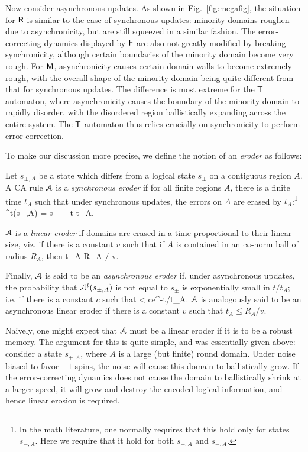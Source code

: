 \documentclass[pra,aps,twocolumn,groupedaddress,superscriptaddress,nofootinbib,preprintnumbers]{revtex4-2}
\begin{document}
	Now consider asynchronous updates. As shown in Fig.~\ref{fig:megafig}, the situation for $\mathsf{R}$ is similar to the case of synchronous updates: minority domains roughen due to asynchronicity, but are still squeezed in a similar fashion. The error-correcting dynamics displayed by $\mathsf{F}$ are also not greatly modified by breaking synchronicity, although certain boundaries of the minority domain become very rough. For $\mathsf{M}$, asynchronicity causes certain domain walls to become extremely rough, with the overall shape of the minority domain being quite different from that for synchronous updates. The difference is most extreme for the $\mathsf{T}$ automaton, where asynchronicity causes the boundary of the minority domain to rapidly disorder, with the disordered region ballistically expanding across the entire system. The $\mathsf{T}$ automaton thus relies crucially on synchronicity to perform error correction.  
	
	To make our discussion more precise, we define the notion of an {\it eroder} as follows: 
	\begin{definition}[eroders]
		Let $s_{\pm,A}$ be a state which differs from a logical state $s_{\pm}$ on a  contiguous region $A$. A CA rule $\mathcal{A}$ is a {\it synchronous eroder} if for all finite regions $A$, there is a finite time $t_A$ such that under synchronous updates, the errors on $A$ are erased by $t_A$:\footnote{In the math literature, one normally requires that this hold only for states $s_{-,A}$. Here we require that it hold for both $s_{+,A}$ and $s_{-,A}$.}
		\be \mca^t(s_{\pm,A}) = s_{} \,\,\forall\,\, t \geq t_A.\ee 
		
		$\mathcal{A}$ is a {\it linear eroder} if domains are erased in a time proportional to their linear size, viz. if there is a constant $v$ such that if $A$ is contained in an $\infty$-norm ball of radius $R_A$, then 
		\be t_A \leq R_A / v.\ee  
		
		Finally, $\mathcal{A}$ is said to be an {\it asynchronous eroder} if, under asynchronous updates, the probability that $\mathcal{A}^t(s_{\pm,A})$ is not equal to $s_{\pm}$ is exponentially small in $t/t_A$; i.e. if there is a constant $c$ such that 
		\be {} < ce^{-t/t_A}.\ee 
		$\mathcal{A}$ is analogously said to be an asynchronous linear eroder if there is a constant $v$ such that $t_A \leq R_A / v$.
	\end{definition}
	
	Naively, one might expect that $\mathcal{A}$ must be a linear eroder if it is to be a robust memory. The argument for this is quite simple, and was essentially given above: consider a state $s_{+,A}$, where $A$ is a large (but finite) round domain. Under noise biased to favor $-1$ spins, the noise will cause this domain to ballistically grow. If the error-correcting dynamics does not cause the domain to ballistically shrink at a larger speed, it will grow and destroy the encoded logical information, and hence linear erosion is required. 
	
\end{document}
